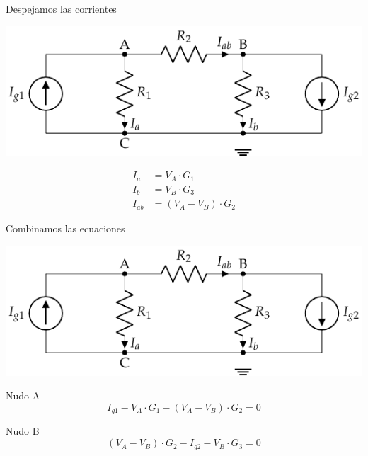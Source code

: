 \documentclass[aspectratio=169, usenames,svgnames,dvipsnames]{beamer}
\begin{document}
\begin{frame}[label={sec:orgbdfedda}]{Despejamos las corrientes}
\begin{center}
\includegraphics[width=.9\linewidth]{../figs/nudos.pdf}
\end{center}

\begin{align*}
  I_a &= V_A \cdot G_1\\
  I_b &= V_B \cdot G_3\\
  I_{ab} &= (V_A - V_B) \cdot G_2
\end{align*}
\end{frame}
\begin{frame}[label={sec:orgeee0c90}]{Combinamos las ecuaciones}
\begin{center}
\includegraphics[width=.9\linewidth]{../figs/nudos.pdf}
\end{center}

Nudo A
\begin{equation*}
  I_{g1} - V_A \cdot G_1 - (V_A - V_B) \cdot G_2 = 0
\end{equation*}

Nudo B
\begin{equation*}
  (V_A - V_B) \cdot G_2 - I_{g2} - V_B \cdot G_3 = 0
\end{equation*}
\end{frame}
\end{document}
